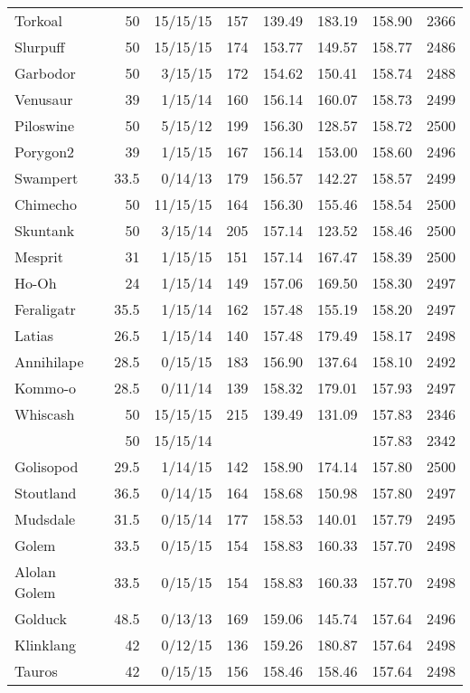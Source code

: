 \begin{longtable}{lrrrrrrr}
Torkoal & 50 & 15/15/15 & 157 & 139.49 & 183.19 & 158.90 & 2366\\
Slurpuff & 50 & 15/15/15 & 174 & 153.77 & 149.57 & 158.77 & 2486\\
Garbodor & 50 & 3/15/15 & 172 & 154.62 & 150.41 & 158.74 & 2488\\
Venusaur & 39 & 1/15/14 & 160 & 156.14 & 160.07 & 158.73 & 2499\\
Piloswine & 50 & 5/15/12 & 199 & 156.30 & 128.57 & 158.72 & 2500\\
Porygon2 & 39 & 1/15/15 & 167 & 156.14 & 153.00 & 158.60 & 2496\\
Swampert & 33.5 & 0/14/13 & 179 & 156.57 & 142.27 & 158.57 & 2499\\
Chimecho & 50 & 11/15/15 & 164 & 156.30 & 155.46 & 158.54 & 2500\\
Skuntank & 50 & 3/15/14 & 205 & 157.14 & 123.52 & 158.46 & 2500\\
Mesprit & 31 & 1/15/15 & 151 & 157.14 & 167.47 & 158.39 & 2500\\
Ho-Oh & 24 & 1/15/14 & 149 & 157.06 & 169.50 & 158.30 & 2497\\
Feraligatr & 35.5 & 1/15/14 & 162 & 157.48 & 155.19 & 158.20 & 2497\\
Latias & 26.5 & 1/15/14 & 140 & 157.48 & 179.49 & 158.17 & 2498\\
Annihilape & 28.5 & 0/15/15 & 183 & 156.90 & 137.64 & 158.10 & 2492\\
Kommo-o & 28.5 & 0/11/14 & 139 & 158.32 & 179.01 & 157.93 & 2497\\
Whiscash & 50 & 15/15/15 & 215 & 139.49 & 131.09 & 157.83 & 2346\\
 & 50 & 15/15/14 & & & & 157.83 & 2342\\
Golisopod & 29.5 & 1/14/15 & 142 & 158.90 & 174.14 & 157.80 & 2500\\
Stoutland & 36.5 & 0/14/15 & 164 & 158.68 & 150.98 & 157.80 & 2497\\
Mudsdale & 31.5 & 0/15/14 & 177 & 158.53 & 140.01 & 157.79 & 2495\\
Golem & 33.5 & 0/15/15 & 154 & 158.83 & 160.33 & 157.70 & 2498\\
Alolan Golem & 33.5 & 0/15/15 & 154 & 158.83 & 160.33 & 157.70 & 2498\\
Golduck & 48.5 & 0/13/13 & 169 & 159.06 & 145.74 & 157.64 & 2496\\
Klinklang & 42 & 0/12/15 & 136 & 159.26 & 180.87 & 157.64 & 2498\\
Tauros & 42 & 0/15/15 & 156 & 158.46 & 158.46 & 157.64 & 2498\\

\end{longtable}
